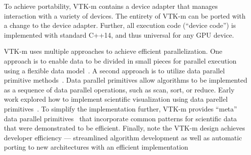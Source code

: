 To achieve portability, VTK-m contains a device adapter that manages interaction with a variety of devices.
The entirety of VTK-m can be ported with a change to the device adapter.
%
Further, all execution code (``device code'') is implemented with standard C++14, and thus universal for any GPU device.

VTK-m uses multiple approaches to achieve efficient parallelization.
One approach is 
to enable data to be divided in small pieces for parallel execution
using a 
flexible data model~\cite{Meredith2012}.
A second approach is 
to utilize
data parallel primitive methods~\cite{Blelloch1990}.
Data parallel primitives allow algorithms to be implemented as a sequence of data parallel operations, such as scan, sort, or reduce.
Early work explored how to implement scientific visualization using data parellel primitives~\cite{Lo2012}.
To simplify the implementation further, VTK-m provides ``meta'' data parallel primitives~\cite{Moreland2021} that incorporate common patterns for scientific data that were demonstrated to be efficient.
Finally, note the VTK-m design achieves developer efficiency --- 
streamlined algorithm development as well as 
automatic
porting to new architectures with an efficient implementation 

